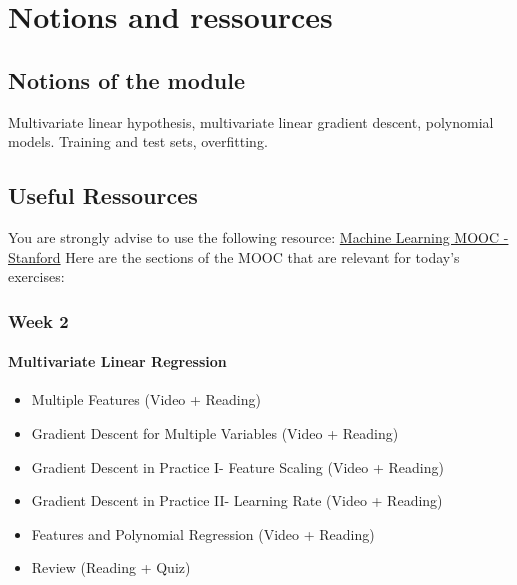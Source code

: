 

\chapter*{Notions and ressources}

\section*{Notions of the module}
Multivariate linear hypothesis, multivariate linear gradient descent, polynomial models. 
Training and test sets, overfitting.

\section*{Useful Ressources}

You are strongly advise to use the following resource:
\href{https://www.coursera.org/learn/machine-learning/home/week/2}{Machine Learning MOOC - Stanford}
Here are the sections of the MOOC that are relevant for today's exercises: 

\subsection*{Week 2}

\subsubsection*{Multivariate Linear Regression}
\begin{itemize}
  \item Multiple Features (Video + Reading)
  \item Gradient Descent for Multiple Variables (Video + Reading)
  \item Gradient Descent in Practice I- Feature Scaling (Video + Reading)
  \item Gradient Descent in Practice II- Learning Rate (Video + Reading)
  \item Features and Polynomial Regression (Video + Reading)
  \item Review (Reading + Quiz)
\end{itemize}
